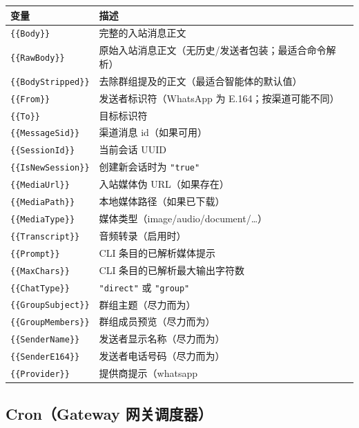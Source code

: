 \begin{table}[h]
\centering
\small
\begin{tabular}{|l|l|}
\hline
变量 & 描述 \\
\hline
\texttt{\{\{Body\}\}} & 完整的入站消息正文 \\
\hline
\texttt{\{\{RawBody\}\}} & 原始入站消息正文（无历史/发送者包装；最适合命令解析） \\
\hline
\texttt{\{\{BodyStripped\}\}} & 去除群组提及的正文（最适合智能体的默认值） \\
\hline
\texttt{\{\{From\}\}} & 发送者标识符（WhatsApp 为 E.164；按渠道可能不同） \\
\hline
\texttt{\{\{To\}\}} & 目标标识符 \\
\hline
\texttt{\{\{MessageSid\}\}} & 渠道消息 id（如果可用） \\
\hline
\texttt{\{\{SessionId\}\}} & 当前会话 UUID \\
\hline
\texttt{\{\{IsNewSession\}\}} & 创建新会话时为 \texttt{"true"} \\
\hline
\texttt{\{\{MediaUrl\}\}} & 入站媒体伪 URL（如果存在） \\
\hline
\texttt{\{\{MediaPath\}\}} & 本地媒体路径（如果已下载） \\
\hline
\texttt{\{\{MediaType\}\}} & 媒体类型（image/audio/document/…） \\
\hline
\texttt{\{\{Transcript\}\}} & 音频转录（启用时） \\
\hline
\texttt{\{\{Prompt\}\}} & CLI 条目的已解析媒体提示 \\
\hline
\texttt{\{\{MaxChars\}\}} & CLI 条目的已解析最大输出字符数 \\
\hline
\texttt{\{\{ChatType\}\}} & \texttt{"direct"} 或 \texttt{"group"} \\
\hline
\texttt{\{\{GroupSubject\}\}} & 群组主题（尽力而为） \\
\hline
\texttt{\{\{GroupMembers\}\}} & 群组成员预览（尽力而为） \\
\hline
\texttt{\{\{SenderName\}\}} & 发送者显示名称（尽力而为） \\
\hline
\texttt{\{\{SenderE164\}\}} & 发送者电话号码（尽力而为） \\
\hline
\texttt{\{\{Provider\}\}} & 提供商提示（whatsapp \\
\hline
\end{tabular}
\end{table}



\subsection{Cron（Gateway 网关调度器）}


